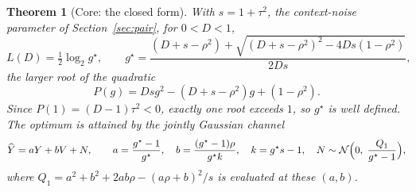 ﻿\documentclass[11pt,onecolumn]{IEEEtran}
\newtheorem{theorem}{Theorem}
\newcommand{\hY}{\widehat{Y}}
\begin{document}
\begin{theorem}[Core: the closed form]\label{thm:function}
With $s=1+\tau^2$, the context-noise parameter of
Section~\ref{sec:pair}, for $0<D<1$,
\begin{equation}
L(D)=\tfrac12\log_2 g^\star,\qquad
g^\star=\frac{(D+s-\rho^2)+\sqrt{(D+s-\rho^2)^2-4Ds(1-\rho^2)}}{2Ds},
\label{eq:quadratic}
\end{equation}
the larger root of the quadratic
\begin{equation}
P(g)=Dsg^2-(D+s-\rho^2)g+(1-\rho^2).
\label{eq:Pg}
\end{equation}
Since $P(1)=(D-1)\tau^2<0$, exactly one root exceeds $1$, so $g^\star$
is well defined. The optimum is attained by the jointly Gaussian channel
\begin{equation}
\hY=aY+bV+N,\qquad
a=\frac{g^\star-1}{g^\star},\quad
b=\frac{(g^\star-1)\rho}{g^\star k},\quad
k=g^\star s-1,\quad
N\sim\mathcal N\Bigl(0,\;\frac{Q_1}{g^\star-1}\Bigr),
\label{eq:channel}
\end{equation}
where $Q_1=a^2+b^2+2ab\rho-(a\rho+b)^2/s$ is evaluated at these
$(a,b)$.
\end{theorem}
\end{document}
